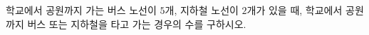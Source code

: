 \hspace*{2mm}\begin{minipage}[t]{\dimexpr\linewidth-2mm\relax}\vspace{0pt}
학교에서 공원까지 가는 버스 노선이 $5$개, 지하철 노선이 $2$개가 있을 때, 학교에서 공원까지 버스 또는 지하철을 타고 가는 경우의 수를 구하시오.\end{minipage}
